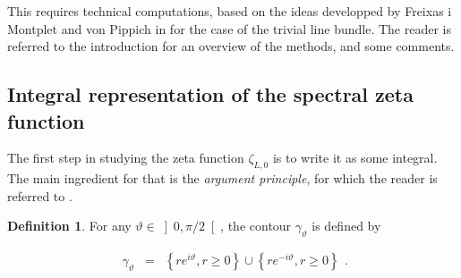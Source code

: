 \documentclass{jams-l}
\theoremstyle{definition}
\newtheorem{definition}[theorem]{Definition}
\theoremstyle{remark}
\numberwithin{equation}{section}
\begin{document}
    \noindent This requires technical computations, based on the ideas developped by Freixas i Montplet and von Pippich in \cite{MR4167014} for the case of the trivial line bundle. The reader is referred to the introduction for an overview of the methods, and some comments.

    
    \subsection{Integral representation of the spectral zeta function}
    \label{SubSecIntegralRepresentationSpectralZeta}
    
        The first step in studying the zeta function $\zeta_{L,0}$ is to write it as some integral. The main ingredient for that is the \textit{argument principle}, for which the reader is referred to \cite[Sec. 3.4]{MR1976398}.
        
        \begin{definition}
        
            For any $\vartheta \in \left] 0, \pi/2 \right[$, the contour $\gamma_{\vartheta}$ is defined by
            
            \[ \begin{array}{lll}
                    \gamma_{\vartheta} & = & \left \{ r e^{i \vartheta}, r \geqslant 0 \right \} \cup \left \{ r e^{- i \vartheta}, r \geqslant 0 \right \}
                \end{array} . \]
        
        \end{definition}
        
\end{document}
